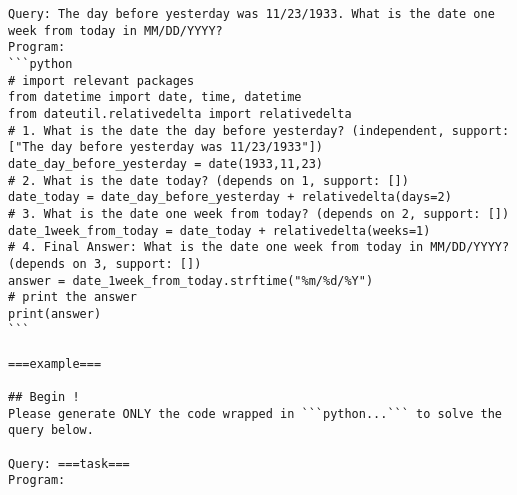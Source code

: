 \begin{tcolorbox}[title=Prompt on Date, breakable, width=\textwidth,top=0mm]
\begin{Verbatim}[breaklines, fontsize=\footnotesize]
Query: The day before yesterday was 11/23/1933. What is the date one week from today in MM/DD/YYYY?
Program:
```python
# import relevant packages
from datetime import date, time, datetime
from dateutil.relativedelta import relativedelta
# 1. What is the date the day before yesterday? (independent, support: ["The day before yesterday was 11/23/1933"])
date_day_before_yesterday = date(1933,11,23)
# 2. What is the date today? (depends on 1, support: [])
date_today = date_day_before_yesterday + relativedelta(days=2)
# 3. What is the date one week from today? (depends on 2, support: [])
date_1week_from_today = date_today + relativedelta(weeks=1)
# 4. Final Answer: What is the date one week from today in MM/DD/YYYY? (depends on 3, support: [])
answer = date_1week_from_today.strftime("%m/%d/%Y")
# print the answer
print(answer)
```

===example===

## Begin !
Please generate ONLY the code wrapped in ```python...``` to solve the query below.

Query: ===task===
Program:
\end{Verbatim}
\end{tcolorbox}



